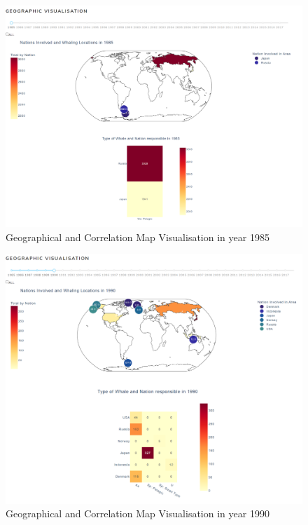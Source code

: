 \documentclass[12pt,a4paper]{article}
\begin{document}
\begin{figure}[H]
    \centering
    \includegraphics[width = 15cm]{Choro+corr.png}
    \caption{Geographical and Correlation Map Visualisation in year 1985}
    \label{fig:heatmap1}
\end{figure}

\begin{figure}[H]
    \centering
    \includegraphics[width = 15cm]{Choro+corr2.png}
    \caption{Geographical and Correlation Map Visualisation in year 1990}
    \label{fig:heatmap2}
\end{figure}
\end{document}
